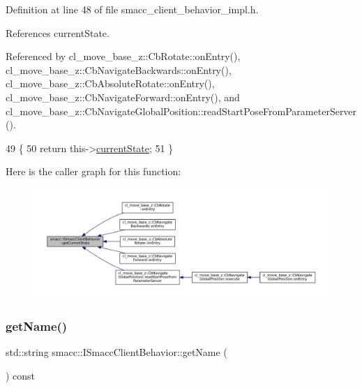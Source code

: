 Definition at line 48 of file smacc\+\_\+client\+\_\+behavior\+\_\+impl.\+h.



References current\+State.



Referenced by cl\+\_\+move\+\_\+base\+\_\+z\+::\+Cb\+Rotate\+::on\+Entry(), cl\+\_\+move\+\_\+base\+\_\+z\+::\+Cb\+Navigate\+Backwards\+::on\+Entry(), cl\+\_\+move\+\_\+base\+\_\+z\+::\+Cb\+Absolute\+Rotate\+::on\+Entry(), cl\+\_\+move\+\_\+base\+\_\+z\+::\+Cb\+Navigate\+Forward\+::on\+Entry(), and cl\+\_\+move\+\_\+base\+\_\+z\+::\+Cb\+Navigate\+Global\+Position\+::read\+Start\+Pose\+From\+Parameter\+Server().


\begin{DoxyCode}
49 \{
50     \textcolor{keywordflow}{return} this->\hyperlink{classsmacc_1_1ISmaccClientBehavior_a5a6658a2deb72b700ae595e594617616}{currentState};
51 \}
\end{DoxyCode}
Here is the caller graph for this function\+:
\nopagebreak
\begin{figure}[H]
\begin{center}
\leavevmode
\includegraphics[width=350pt]{classsmacc_1_1ISmaccClientBehavior_a34fde34e48fa13db622ee60d8374d0b8_icgraph}
\end{center}
\end{figure}
\mbox{\label{classsmacc_1_1ISmaccClientBehavior_a18e4bec9460b010f2894c0f7e7064a34}} 
\subsubsection{\texorpdfstring{get\+Name()}{getName()}}
{\footnotesize\ttfamily std\+::string smacc\+::\+I\+Smacc\+Client\+Behavior\+::get\+Name (\begin{DoxyParamCaption}{ }\end{DoxyParamCaption}) const}



